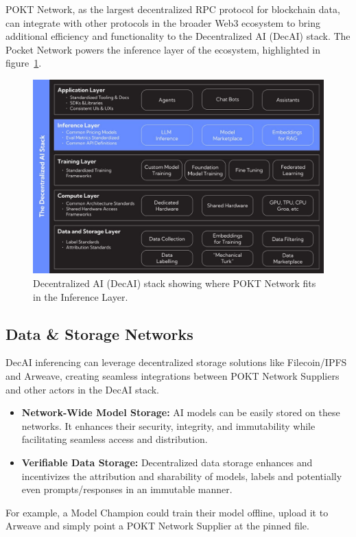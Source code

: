 \documentclass[conference,compsoc]{IEEEtran}
\begin{document}
POKT Network, as the largest decentralized RPC protocol for blockchain data, can integrate with other protocols in the broader Web3 ecosystem to bring additional efficiency and functionality to the Decentralized AI (DecAI) stack. The Pocket Network powers the inference layer of the ecosystem, highlighted in figure~\ref{fig_stack}.


\begin{figure}[!h]
\centering
\includegraphics[width=0.9\linewidth]{stack.jpeg}
\caption{Decentralized AI (DecAI) stack showing where POKT Network fits in the Inference Layer.}
\label{fig_stack}
\end{figure}

\subsection{Data \& Storage Networks}
DecAI inferencing can leverage decentralized storage solutions like Filecoin/IPFS and Arweave, creating seamless integrations between POKT Network Suppliers and other actors in the DecAI stack.

\begin{itemize}
    \item \textbf{Network-Wide Model Storage:} AI models can be easily stored on these networks. It enhances their security, integrity, and immutability while facilitating seamless access and distribution.

    \item \textbf{Verifiable Data Storage:} Decentralized data storage enhances and incentivizes the attribution and sharability of models, labels and potentially even prompts/responses in an immutable manner.

\end{itemize}
For example, a Model Champion could train their model offline, upload it to Arweave and simply point a POKT Network Supplier at the pinned file.
\end{document}
